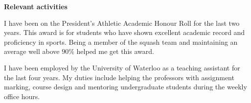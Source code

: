 \documentclass[12pt]{article}
\begin{document}
\noindent\textbf{Relevant activities}

\vspace{0.1in}\noindent 
I have been on the President's Athletic Academic Honour Roll for the last two years. This award is for students who have shown excellent academic record and proficiency in sports. Being a member of the squash team and maintaining an average well above $90\%$ helped me get this award. 

\noindent I have been employed by the University of Waterloo as a teaching assistant for the last four years. My duties include helping the professors with assignment marking, course design and mentoring undergraduate students during the weekly office hours. 
\end{document}
